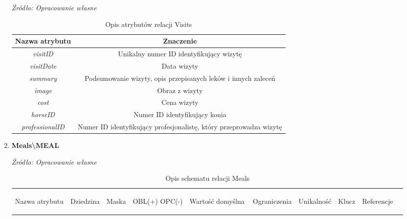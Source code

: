 \documentclass[12pt,oneside]{report}
\begin{document}
\begin{enumerate}[start=10,label={\bfseries REL\textbackslash\arabic*}]
	\begin{table}[H]
		\caption{Opis atrybutów relacji Visits}
		\textit{Źródło: Opracowanie własne}
		\label{VisitsAttributeDescription}
		\centering
		\begin{tabular}{|c|c|}
			\hline
			Nazwa atrybutu & Znaczenie \\
						\hline
			\textit{visitID}&Unikalny numer ID identyfikujący wizytę\\	
			\hline	
			\textit{visitDate}& Data wizyty\\	
			\hline	
			\textit{summary}& Podsumowanie wizyty, opis przepisanych leków i innych zaleceń\\	
			\hline	
			\textit{image}& Obraz z wizyty\\	
			\hline
			\textit{cost}&Cena wizyty\\	
			\hline			
			\textit{horseID}&Numer ID identyfikujący konia\\	
			\hline			
			\textit{professionalID}&Numer ID identyfikujący profesjonalistę, który przeprowadza wizytę\\	
			\hline
		\end{tabular}
	\end{table}
	\item \textbf{Meals\textbackslash MEAL} 
	\begin{table}[H]
		\caption{Opis schematu relacji Meals}
		\textit{Źródło: Opracowanie własne}
		\label{MealsRelationSchema}
		\centering
		\begin{tabular}{|c|c|c|c|c|c|c|c|c|c|}
			\hline
			\begin{sideways}Nazwa atrybutu\end{sideways}& 
			\begin{sideways}Dziedzina \end{sideways}& 
			\begin{sideways}Maska \end{sideways}& 
			\begin{sideways}OBL(+) OPC(-)\end{sideways} & 
			\begin{sideways}Wartość domyślna$\ $\end{sideways}& 
			\begin{sideways}Ograniczenia\end{sideways} &
			\begin{sideways}Unikalność \end{sideways}& 
			\begin{sideways}Klucz \end{sideways}& 
			\begin{sideways}Referencje \end{sideways}&

\end{tabular}
\end{table}
\end{enumerate}
\end{document}
